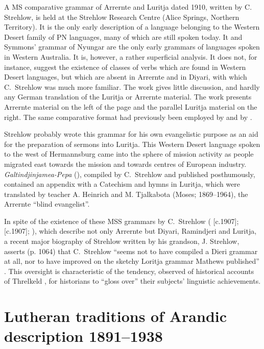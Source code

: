 A MS comparative grammar of Arrernte and Luritja dated 1910, written by C. Strehlow, is held at the Strehlow Research Centre (Alice Springs, Northern Territory). It is the only early description of a language belonging to the Western Desert family of PN languages, many of which are still spoken today. It and Symmons' grammar of Nyungar \citeyearpar{symmons_grammatical_1841} are the only early grammars of languages spoken in Western Australia. It is, however, a rather superficial analysis. It does not, for instance, suggest the existence of classes of verbs which are found in Western Desert languages, but which are absent in Arrernte and in Diyari, with which C.~Strehlow was much more familiar. The work gives little discussion, and hardly any German translation of the Luritja or Arrernte material. The work presents Arrernte material on the left of the page and the parallel Luritja material on the right. The same comparative format had previously been employed by \citet{flierl_dieri_1880} and by \citet{hale_languages_1846}.

Strehlow probably wrote this grammar for his own evangelistic purpose as an aid for the preparation of sermons into Luritja. This Western Desert language spoken to the west of Hermannsburg came into the sphere of mission activity as people migrated east towards the mission and towards centres of European industry. \textit{Galtindjinjamea-Pepa} (\citeyear{Strehlow1924}), compiled by C.~Strehlow and published posthumously, contained an appendix with a Catechism and hymns in Luritja, which were translated by teacher A. Heinrich and M. Tjalkabota (Moses; 1869--1964), the Arrernte ``blind evangelist''.

In spite of the existence of these MSS grammars by C.~Strehlow (\citeyear{strehlow_untitled_1931} [c.1907]; \citeyear{strehlow_grammatik_1931} [c.1907]; \citeyear{strehlow_notitle_1910}), which describe not only Arrernte but Diyari, Ramindjeri and Luritja, a recent major biography of Strehlow written by his grandson, J. Strehlow, asserts (p. 1064) that C.~Strehlow “seems not to have compiled a Dieri grammar at all, nor to have improved on the sketchy Loritja grammar Mathews published” \citep[1064]{strehlow_tale_2011}. This oversight is characteristic of the tendency, observed of historical accounts of Threlkeld \citep[108]{roberts_language_2008}, for historians to “gloss over” their subjects' linguistic achievements.

\section{Lutheran traditions of Arandic description 1891--1938}
\label{sec:key:9.3}\label{bkm:Ref326948586}

